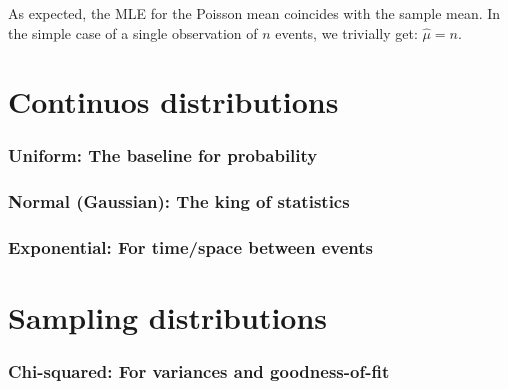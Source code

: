 As expected, the MLE for the Poisson mean coincides with the sample mean. In the simple case of a single observation of $n$ events, we trivially get: $\hat\mu=n$.

\section{Continuos distributions}
\subsubsection{Uniform: The baseline for probability}

\subsubsection{Normal (Gaussian): The king of statistics}

\subsubsection{Exponential: For time/space between events}




\section{Sampling distributions}

\subsubsection{Chi-squared: For variances and goodness-of-fit}

